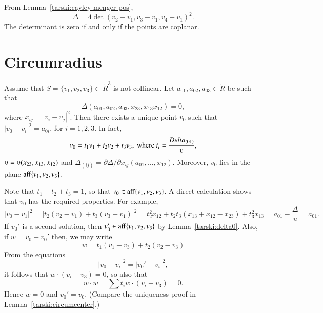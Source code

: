 \begin{tarskidata}
\begin{tarski}
\begin{proved}  From Lemma~\ref{tarski:cayley-menger-pos},
  $$
  \Delta = 4\det(v_2-v_1,v_3-v_1,v_4-v_1)^2.
  $$
The determinant is zero if and only if the points are coplanar.
\swallowed\end{proved}
\end{tarski}


\section{Circumradius}
\begin{tarski}

\begin{lemma}  
Assume that $S=\{v_1,v_2,v_3\}\subset\ring{R}^3$ is not collinear.
Let $a_{01},a_{02},a_{03}\in\ring{R}$ be such that
$$
   \Delta(a_{01},a_{02},a_{03},x_{23},x_{13}x_{12})=0,
$$
where $x_{ij}=|v_i-v_j|^2$.
Then there exists a unique point $v_0$ such that $|v_0-v_i|^2 = a_{0i}$, for $i=1,2,3$.
In fact, 
  $$
  v_0 = t_1 v_1 + t_2 v_2 + t_3 v_3, \hbox{ where } t_i = \frac{\Delta_{(01)}}{\ups},
  $$
$\ups=\ups(x_{23},x_{13},x_{12})$ and $\Delta_{(ij)} = \partial\Delta/\partial x_{ij}(a_{01},\ldots,x_{12})$.
Moreover, $v_0$ lies in the plane ${\operatorname{aff}}\{v_1,v_2,v_3\}$.
\end{lemma}

\begin{proved}  
Note that $t_1+t_2+t_3=1$, so that $v_0\in{\operatorname{aff}}\{v_1,v_2,v_3\}$.
A direct calculation shows that $v_0$ has the required properties.
For example,
$$
 |v_0-v_1|^2 = |t_2 (v_2-v_1) + t_3 (v_3-v_1)|^2 = t_2^2 x_{12} + t_2 t_3 (x_{13}+x_{12}-x_{23})  + t_3^2 x_{13} =
 a_{01} - \frac{\Delta}u = a_{01}.
$$
If $v_0'$ is a second solution, then $v_0'\in{\operatorname{aff}}\{v_1,v_2,v_3\}$ by Lemma~\ref{tarski:delta0}.
Also, if $w=v_0-v_0'$ then, we may write
   $$w = t_1 (v_1-v_3) + t_2 (v_2-v_3)$$
From the equations 
    $$
    |v_0-v_i|^2 = |v_0'-v_i|^2,
    $$
it follows that $w\cdot (v_i-v_3) = 0$, so also that
    $$w\cdot w = \sum t_i w\cdot (v_i-v_3) = 0.$$
Hence $w=0$ and $v_0'=v_0$.  (Compare the uniqueness proof in Lemma~\ref{tarski:circumcenter}.)
\swallowed\end{proved}
\end{tarski}









\end{tarskidata}
